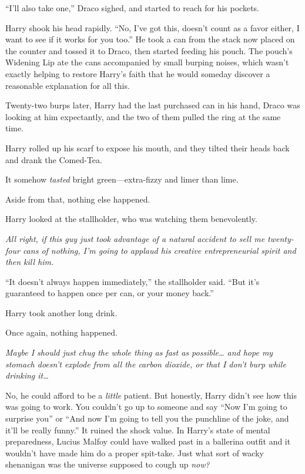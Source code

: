 ``I'll also take one,'' Draco sighed, and started to reach for his
pockets.

Harry shook his head rapidly. ``No, I've got this, doesn't count as a
favor either, I want to see if it works for you too.'' He took a can
from the stack now placed on the counter and tossed it to Draco, then
started feeding his pouch. The pouch's Widening Lip ate the cans
accompanied by small burping noises, which wasn't exactly helping to
restore Harry's faith that he would someday discover a reasonable
explanation for all this.

Twenty-two burps later, Harry had the last purchased can in his hand,
Draco was looking at him expectantly, and the two of them pulled the
ring at the same time.

Harry rolled up his scarf to expose his mouth, and they tilted their
heads back and drank the Comed-Tea.

It somehow \emph{tasted} bright green---extra-fizzy and limer than lime.

Aside from that, nothing else happened.

Harry looked at the stallholder, who was watching them benevolently.

\emph{All right, if this guy just took advantage of a natural accident
to sell me twenty-four cans of nothing, I'm going to applaud his
creative entrepreneurial spirit and then kill him.}

``It doesn't always happen immediately,'' the stallholder said. ``But
it's guaranteed to happen once per can, or your money back.''

Harry took another long drink.

Once again, nothing happened.

\emph{Maybe I should just chug the whole thing as fast as
possible\ldots{} and hope my stomach doesn't explode from all the carbon
dioxide, or that I don't burp while drinking it\ldots{}}

No, he could afford to be a \emph{little} patient. But honestly, Harry
didn't see how this was going to work. You couldn't go up to someone and
say ``Now I'm going to surprise you'' or ``And now I'm going to tell you
the punchline of the joke, and it'll be really funny.'' It ruined the
shock value. In Harry's state of mental preparedness, Lucius Malfoy
could have walked past in a ballerina outfit and it wouldn't have made
him do a proper spit-take. Just what sort of wacky shenanigan was the
universe supposed to cough up \emph{now?}

